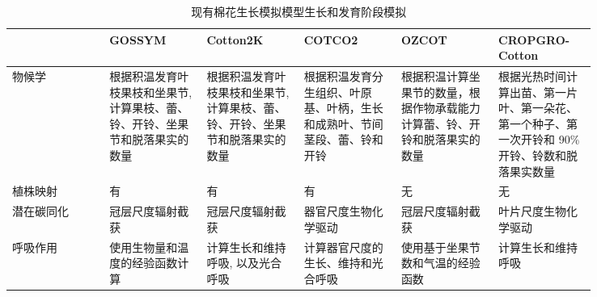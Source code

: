 \documentclass[a4paper,zihao=5]{ctexbook}
\begin{document}
\begin{table}
    \small
    \caption{现有棉花生长模拟模型生长和发育阶段模拟}
    \label{tab:growdev}
    \begin{tabular}{p{0.14\linewidth}p{0.14\linewidth}p{0.14\linewidth}p{0.14\linewidth}p{0.14\linewidth}p{0.14\linewidth}}
        \toprule
                   & GOSSYM                                                                       & Cotton2K                                                                     & COTCO2                                                                   & OZCOT                                                                      & CROPGRO-Cotton                                                                                   \\
        \midrule
        物候学     & 根据积温发育叶枝果枝和坐果节, 计算果枝、蕾、铃、开铃、坐果节和脱落果实的数量 & 根据积温发育叶枝果枝和坐果节, 计算果枝、蕾、铃、开铃、坐果节和脱落果实的数量 & 根据积温发育分生组织、叶原基、叶柄，生长和成熟叶、节间茎段、蕾、铃和开铃 & 根据积温计算坐果节的数量，根据作物承载能力计算蕾、铃、开铃和脱落果实的数量 & 根据光热时间计算出苗、第一片叶、第一朵花、第一个种子、第一次开铃和 90\% 开铃、铃数和脱落果实数量 \\
        植株映射   & 有                                                                           & 有                                                                           & 有                                                                       & 无                                                                         & 无                                                                                               \\
        潜在碳同化 & 冠层尺度辐射截获                                                             & 冠层尺度辐射截获                                                             & 器官尺度生物化学驱动 \cite{farquhar1980}                                 & 冠层尺度辐射截获                                                           & 叶片尺度生物化学驱动 \cite{farquhar1980}                                                         \\
        呼吸作用   & 使用生物量和温度的经验函数计算                                               & 计算生长和维持呼吸, 以及光合呼吸                                             & 计算器官尺度的生长、维持和光合呼吸                                       & 使用基于坐果节数和气温的经验函数                                           & 计算生长和维持呼吸                                                                               \\

\end{tabular}
\end{table}
\end{document}
